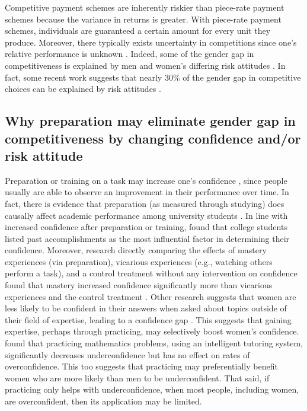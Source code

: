 \documentclass[letterpaper, nobind]{templates/ociamthesis}
\begin{document}
Competitive payment schemes are inherently riskier than piece-rate payment schemes because the variance in returns is greater. With piece-rate payment schemes, individuals are guaranteed a certain amount for every unit they produce. Moreover, there typically exists uncertainty in competitions since one's relative performance is unknown \autocite{Niederle2011}. Indeed, some of the gender gap in competitiveness is explained by men and women's differing risk attitudes \autocite{Niederle2011}. In fact, some recent work suggests that nearly 30\% of the gender gap in competitive choices can be explained by risk attitudes \autocite{Gillen2019,Veldhuizen2017}.

\hypertarget{why-preparation-may-eliminate-gender-gap-in-competitiveness-by-changing-confidence-andor-risk-attitude}{%
\subsection{Why preparation may eliminate gender gap in competitiveness by changing confidence and/or risk attitude}\label{why-preparation-may-eliminate-gender-gap-in-competitiveness-by-changing-confidence-andor-risk-attitude}}

Preparation or training on a task may increase one's confidence \autocite{Gist1992,Schunk1981,Schunk1982,Usher2008}, since people usually are able to observe an improvement in their performance over time. In fact, there is evidence that preparation (as measured through studying) does causally affect academic performance among university students \autocite{Stinebrickner2008}. In line with increased confidence after preparation or training, \textcite{Lent1996} found that college students listed past accomplishments as the most influential factor in determining their confidence. Moreover, research directly comparing the effects of mastery experiences (via preparation), vicarious experiences (e.g., watching others perform a task), and a control treatment without any intervention on confidence found that mastery increased confidence significantly more than vicarious experiences and the control treatment \autocite{Bandura1977a}. Other research suggests that women are less likely to be confident in their answers when asked about topics outside of their field of expertise, leading to a confidence gap \autocite{Sarsons2021}. This suggests that gaining expertise, perhaps through practicing, may selectively boost women's confidence. \textcite{Roll2011} found that practicing mathematics problems, using an intelligent tutoring system, significantly decreases underconfidence but has no effect on rates of overconfidence. This too suggests that practicing may preferentially benefit women who are more likely than men to be underconfident. That said, if practicing only helps with underconfidence, when most people, including women, are overconfident, then its application may be limited.
\end{document}
